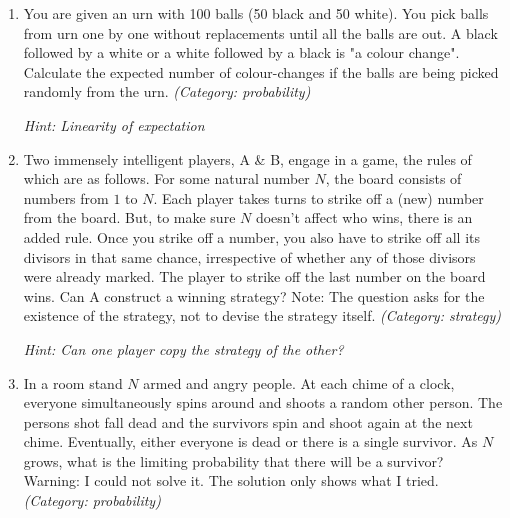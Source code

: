 \begin{enumerate}

\item You are given an urn with 100 balls (50 black and 50 white). You pick balls from urn one by one without replacements until all the balls are out. A black followed by a white or a white followed by a black is "a colour change". Calculate the expected number of colour-changes if the balls are being picked randomly from the urn.
\small\emph{(Category: probability)}

\small\emph{Hint: Linearity of expectation}





\item Two immensely intelligent players, A \& B, engage in a game, the rules of which are as follows. For some natural number $N$, the board consists of numbers from $1$ to $N$. Each player takes turns to strike off a (new) number from the board. But, to make sure $N$ doesn't affect who wins, there is an added rule. Once you strike off a number, you also have to strike off all its divisors in that same chance, irrespective of whether any of those divisors were already marked. The player to strike off the last number on the board wins.
Can A construct a winning strategy?
Note: The question asks for the existence of the strategy, not to devise the strategy itself.
\small\emph{(Category: strategy)}

\small\emph{Hint: Can one player copy the strategy of the other?}





\item In a room stand $N$ armed and angry people. At each chime of a clock, everyone simultaneously spins around and shoots a random other person. The persons shot fall dead and the survivors spin and shoot again at the next chime. Eventually, either everyone is dead or there is a single survivor.
As $N$ grows, what is the limiting probability that there will be a survivor?
Warning: I could not solve it. The solution only shows what I tried.
\small\emph{(Category: probability)}




\end{enumerate}
